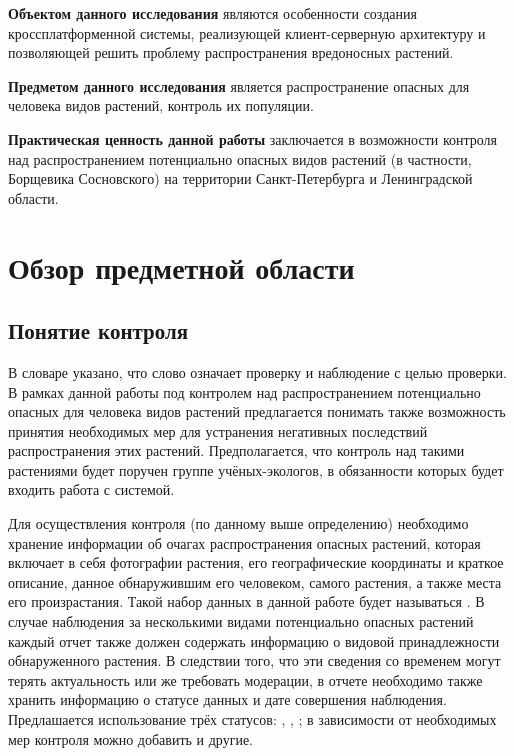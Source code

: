 \nwln
\textbf{Объектом данного исследования} являются особенности создания кроссплатформенной системы, реализующей клиент-серверную архитектуру и позволяющей решить проблему распространения вредоносных растений.

\nwln
\textbf{Предметом данного исследования} является распространение опасных для человека видов растений, контроль их популяции.

\nwln
\textbf{Практическая ценность данной работы} заключается в возможности контроля над распространением потенциально опасных видов растений (в частности, Борщевика Сосновского) на территории Санкт-Петербурга и Ленинградской области.

\section{Обзор предметной области}

\subsection{Понятие контроля}

\tab
В словаре\cite{control} указано, что слово  означает проверку и наблюдение с целью проверки.
В рамках данной работы под контролем над распространением потенциально опасных для человека видов растений предлагается понимать также возможность принятия необходимых мер для устранения негативных последствий распространения этих растений.
Предполагается, что контроль над такими растениями будет поручен группе учёных-экологов, в обязанности которых будет входить работа с системой.

\nwln
Для осуществления контроля (по данному выше определению) необходимо хранение информации об очагах распространения опасных растений, которая включает в себя фотографии растения, его географические координаты и краткое описание, данное обнаружившим его человеком, самого растения, а также места его произрастания.
Такой набор данных в данной работе будет называться .
В случае наблюдения за несколькими видами потенциально опасных растений каждый отчет также должен содержать информацию о видовой принадлежности обнаруженного растения.
В следствии того, что эти сведения со временем могут терять актуальность или же требовать модерации, в отчете необходимо также хранить информацию о статусе данных и дате совершения наблюдения.
Предлашается использование трёх статусов: , , ; в зависимости от необходимых мер контроля можно добавить и другие.

